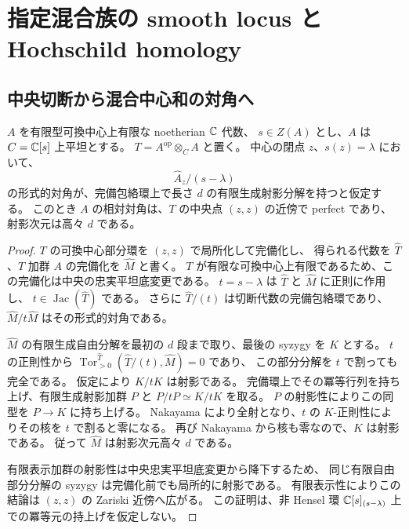 \section{指定混合族の smooth locus と Hochschild homology}
\label{mix:sec:smooth-locus}

\subsection{中央切断から混合中心和の対角へ}
\label{cmo:subsec:slice-mixed-diagonal}

\begin{lemma}[形式的中央ファイバーから相対対角への持上げ]
\label{cmo:lem:relative-diagonal-from-slice}
$A$ を有限型可換中心上有限な noetherian $\mathbb C$ 代数、
$s\in Z(A)$ とし、$A$ は $C=\mathbb C[s]$ 上平坦とする。
$T=A^{\mathrm{op}}\otimes_C A$ と置く。
中心の閉点 $z$、$s(z)=\lambda$ において、
\[
 \widehat A_z/(s-\lambda)
\]
の形式的対角が、完備包絡環上で長さ $d$ の有限生成射影分解を持つと仮定する。
このとき $A$ の相対対角は、$T$ の中央点 $(z,z)$ の近傍で perfect であり、
射影次元は高々 $d$ である。
\end{lemma}

\begin{proof}
$T$ の可換中心部分環を $(z,z)$ で局所化して完備化し、
得られる代数を $\widehat T$、$T$ 加群 $A$ の完備化を $\widehat M$ と書く。
$T$ が有限な可換中心上有限であるため、この完備化は中央の忠実平坦底変更である。
$t=s-\lambda$ は $\widehat T$ と $\widehat M$ に正則に作用し、
$t\in\operatorname{Jac}(\widehat T)$ である。
さらに $\widehat T/(t)$ は切断代数の完備包絡環であり、
$\widehat M/t\widehat M$ はその形式的対角である。

$\widehat M$ の有限生成自由分解を最初の $d$ 段まで取り、最後の syzygy を $K$ とする。
$t$ の正則性から $\operatorname{Tor}^{\widehat T}_{>0}(\widehat T/(t),\widehat M)=0$ であり、
この部分分解を $t$ で割っても完全である。
仮定により $K/tK$ は射影である。
完備環上でその冪等行列を持ち上げ、有限生成射影加群 $P$ と
$P/tP\simeq K/tK$ を取る。
$P$ の射影性によりこの同型を $P\to K$ に持ち上げる。
Nakayama により全射となり、$t$ の $K$-正則性によりその核を $t$ で割ると零になる。
再び Nakayama から核も零なので、$K$ は射影である。
従って $\widehat M$ は射影次元高々 $d$ である。

有限表示加群の射影性は中央忠実平坦底変更から降下するため、
同じ有限自由部分分解の syzygy は完備化前でも局所的に射影である。
有限表示性によりこの結論は $(z,z)$ の Zariski 近傍へ広がる。
この証明は、非 Hensel 環 $\mathbb C[s]_{(s-\lambda)}$ 上での冪等元の持上げを仮定しない。
\end{proof}

